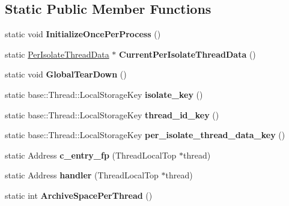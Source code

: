 \subsection*{Static Public Member Functions}
\begin{DoxyCompactItemize}
\item 
static void {\bfseries Initialize\+Once\+Per\+Process} ()\hypertarget{classv8_1_1internal_1_1_isolate_a04b11e5e7cb6d5a5c85e53cae6915221}{}\label{classv8_1_1internal_1_1_isolate_a04b11e5e7cb6d5a5c85e53cae6915221}

\item 
static \hyperlink{classv8_1_1internal_1_1_isolate_1_1_per_isolate_thread_data}{Per\+Isolate\+Thread\+Data} $\ast$ {\bfseries Current\+Per\+Isolate\+Thread\+Data} ()\hypertarget{classv8_1_1internal_1_1_isolate_a826750b3afeec400dcbc3091f7cbef84}{}\label{classv8_1_1internal_1_1_isolate_a826750b3afeec400dcbc3091f7cbef84}

\item 
static void {\bfseries Global\+Tear\+Down} ()\hypertarget{classv8_1_1internal_1_1_isolate_a58b2490f1aa72b15db0a7dabd81db0e2}{}\label{classv8_1_1internal_1_1_isolate_a58b2490f1aa72b15db0a7dabd81db0e2}

\item 
static base\+::\+Thread\+::\+Local\+Storage\+Key {\bfseries isolate\+\_\+key} ()\hypertarget{classv8_1_1internal_1_1_isolate_a4e0d9e77cb3331ca8bc2dd0ae01b5a4c}{}\label{classv8_1_1internal_1_1_isolate_a4e0d9e77cb3331ca8bc2dd0ae01b5a4c}

\item 
static base\+::\+Thread\+::\+Local\+Storage\+Key {\bfseries thread\+\_\+id\+\_\+key} ()\hypertarget{classv8_1_1internal_1_1_isolate_a1ecc3a0f0812809ca5f9b97ae781dd09}{}\label{classv8_1_1internal_1_1_isolate_a1ecc3a0f0812809ca5f9b97ae781dd09}

\item 
static base\+::\+Thread\+::\+Local\+Storage\+Key {\bfseries per\+\_\+isolate\+\_\+thread\+\_\+data\+\_\+key} ()\hypertarget{classv8_1_1internal_1_1_isolate_addd1786f6d8285282b1f05a83b51869a}{}\label{classv8_1_1internal_1_1_isolate_addd1786f6d8285282b1f05a83b51869a}

\item 
static Address {\bfseries c\+\_\+entry\+\_\+fp} (Thread\+Local\+Top $\ast$thread)\hypertarget{classv8_1_1internal_1_1_isolate_a25b6042dc972873b942b76f31686c6e1}{}\label{classv8_1_1internal_1_1_isolate_a25b6042dc972873b942b76f31686c6e1}

\item 
static Address {\bfseries handler} (Thread\+Local\+Top $\ast$thread)\hypertarget{classv8_1_1internal_1_1_isolate_ac37e0be2395f4f264decdc154993510d}{}\label{classv8_1_1internal_1_1_isolate_ac37e0be2395f4f264decdc154993510d}

\item 
static int {\bfseries Archive\+Space\+Per\+Thread} ()\hypertarget{classv8_1_1internal_1_1_isolate_a7a165e2049a92057523bacbcaaadbeb4}{}\label{classv8_1_1internal_1_1_isolate_a7a165e2049a92057523bacbcaaadbeb4}

\end{DoxyCompactItemize}
